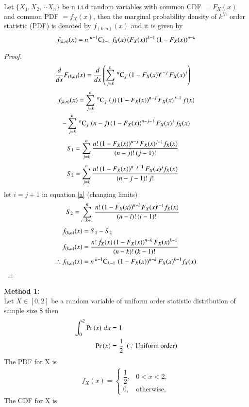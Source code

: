 \documentclass[journal,12pt,twocolumn]{IEEEtran}
\begin{document}
\begin{theorem}
Let $\{X_1, X_2, \cdots X_n\}$ be n i.i.d random variables with common CDF $= F_{X}(x)$ and common PDF $= f_{X}(x)$, 
then the marginal probability density of $k^{th}$ order statistic (PDF) is denoted by $f_{(k,n)}(x)$  and it
is given by
\begin{align}
f_{(k,n)}(x) = n\;{}^{n-1}\mathrm{C}_{k-1}\,f_{X}(x)\,(F_{X}(x))^{k-1}\left(1-F_{X}(x)\right)^{n-k} \label{eqn_2}
\end{align}
\label{th2}
\end{theorem}
\begin{proof}
\begin{align}
\dfrac{d}{dx} F_{(k,n)}(x) &= \dfrac{d}{dx}\left(\sum_{j=k}^{n}\,{}^{n}\mathrm{C}_{j}\,\left(1-F_{X}(x)\right)^{n-j} F_{X}(x)^{j}\right) 
 \end{align}
\begin{multline}
f_{(k,n)}(x) = \sum_{j=k}^{n}\,{}^{n}\mathrm{C}_{j}\,\left(j\right)\left(1-F_{X}(x)\right)^{n-j}F_{X}(x)^{j-1}\,f(x)  \\
                -\sum_{j=k}^{n}\,{}^{n}\mathrm{C}_{j}\,\left(n-j\right)\left(1-F_{X}(x)\right)^{n-j-1}F_{X}(x)^{j}\,f_{X}(x) 
\end{multline}
\begin{align}
S_1  &= \sum_{j=k}^{n} \dfrac{n!\left(1-F_{X}(x)\right)^{n-j}F_{X}(x)^{j-1} f_{X}(x)}{(n-j)!\,(j-1)!} 
\end{align}
\begin{align}
S_2  &= \sum_{j=k}^{n}\dfrac{n!\left(1-F_{X}(x)\right)^{n-j-1}F_{X}(x)^{j}f_{X}(x) }{(n-j-1)!\,j!}\label{a}
\end{align}
let $i = j+1$ in equation \eqref{a} (changing limits)
\begin{align}
S_2  &= \sum_{i=k+1}^{n}\dfrac{n!\left(1-F_{X}(x)\right)^{n-i}F_{X}(x)^{i-1}f_{X}(x)}{(n-i)!\,(i-1)!} 
\end{align}
\begin{align}
f_{(k,n)}(x) &= S_1 - S_2 \\
f_{(k,n)}(x) &= \dfrac{n!\,f_{X}(x)\left(1-F_{X}(x)\right)^{n-k}F_{X}(x)^{k-1}}{(n-k)!\,(k-1)!}\\
\therefore f_{(k,n)}(x) &= n\,{}^{n-1}\mathrm{C}_{k-1}\,\left(1-F_{X}(x)\right)^{n-k}F_{X}(x)^{k-1} f_{X}(x)
\end{align}
\end{proof}
\textbf{Method 1:} \\
Let $X\in[0,2]$ be a random variable of uniform order statistic distribution of sample size 8 then
\begin{align}
 \int_{0}^{2} \Pr\left(x\right)\,dx &= 1 \\
 \Pr\left(x\right)                  &= \dfrac{1}{2}\;\left(\because \text{Uniform order}\right)
\end{align}
The PDF for X is 
\begin{align}
f_{X}(x) = 
 \begin{cases}
  \dfrac{1}{2},      &0<x<2, \\ 
     0, &\text{otherwise,}
 \end{cases} \label{d}
\end{align}
 The CDF for X is 
 
\end{document}
